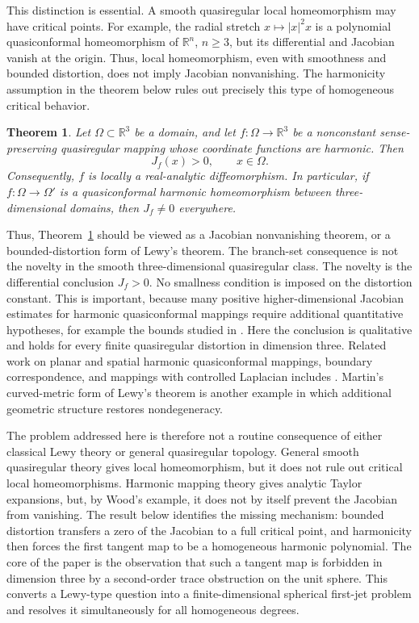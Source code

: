 \documentclass[10pt]{amsart}
\numberwithin{equation}{section}
\newtheorem{theorem}{Theorem}[section]
\theoremstyle{definition}
\newcommand{\R}{\mathbb R}
\begin{document}
This distinction is essential. A smooth quasiregular local homeomorphism may
have critical points. For example, the radial stretch
\(x\mapsto |x|^2x\) is a polynomial quasiconformal homeomorphism of \(\R^n\),
\(n\ge3\), but its differential and Jacobian vanish at the origin. Thus, local
homeomorphism, even with smoothness and bounded distortion, does not imply
Jacobian nonvanishing. The harmonicity assumption in the theorem below rules
out precisely this type of homogeneous critical behavior.

\begin{theorem}
\label{thm-main}
Let \(\Omega\subset\R^3\) be a domain, and let
\(f:\Omega\to\R^3\) be a nonconstant sense-preserving quasiregular mapping
whose coordinate functions are harmonic. Then
\[
        J_f(x)>0,
        \qquad x\in\Omega .
\]
Consequently, \(f\) is locally a real-analytic diffeomorphism. In particular,
if \(f:\Omega\to\Omega'\) is a quasiconformal harmonic homeomorphism between
three-dimensional domains, then \(J_f\ne0\) everywhere.
\end{theorem}

Thus, Theorem~\ref{thm-main} should be viewed as a Jacobian nonvanishing
theorem, or a bounded-distortion form of Lewy's theorem. The branch-set
consequence is not the novelty in the smooth three-dimensional quasiregular
class. The novelty is the differential conclusion \(J_f>0\). No smallness condition is imposed on the distortion
constant. This is important, because many positive higher-dimensional Jacobian
estimates for harmonic quasiconformal mappings require additional quantitative
hypotheses, for example the bounds studied in \cite{BozinMateljevic}.
Here the conclusion is qualitative and holds for every finite quasiregular
distortion in dimension three. Related work on planar and spatial harmonic
quasiconformal mappings, boundary correspondence, and mappings with controlled
Laplacian includes
\cite{AstalaIwaniecMartin,AstalaManojlovic,Pavlovic2002,Kalaj2015,KalajSaksman2019}.
Martin's curved-metric form of Lewy's theorem \cite{Martin2016} is another
example in which additional geometric structure restores nondegeneracy.

The problem addressed here is therefore not a routine consequence of either
classical Lewy theory or general quasiregular topology. General smooth
quasiregular theory gives local homeomorphism, but it does not rule out
critical local homeomorphisms. Harmonic mapping theory gives analytic Taylor
expansions, but, by Wood's example, it does not by itself prevent the Jacobian
from vanishing. The result below identifies the missing mechanism: bounded
distortion transfers a zero of the Jacobian to a full critical point, and
harmonicity then forces the first tangent map to be a homogeneous harmonic
polynomial. The core of the paper is the observation that such a tangent map is
forbidden in dimension three by a second-order trace obstruction on the unit
sphere. This converts a Lewy-type question into a finite-dimensional spherical
first-jet problem and resolves it simultaneously for all homogeneous degrees.
\end{document}
